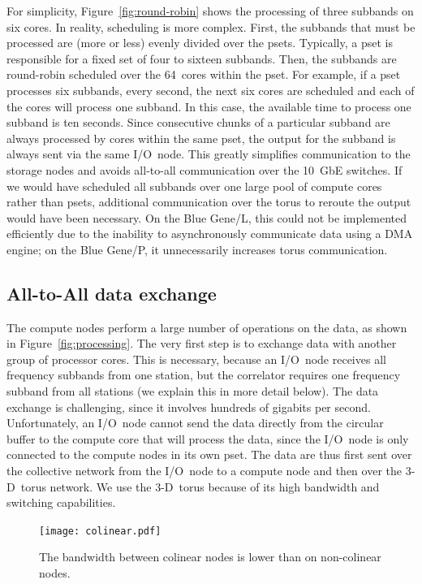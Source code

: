 \documentclass[10pt]{article}
\begin{document}
For simplicity, Figure~\ref{fig:round-robin} shows the processing of
three subbands on six cores.
In reality, scheduling is more complex.
First, the subbands that must be processed are (more or less) evenly divided
over the psets.
Typically, a pset is responsible for a fixed set of four to sixteen subbands.
Then, the subbands are round-robin scheduled over the 64~cores within the
pset.
For example, if a pset processes six subbands, every second, the next six
cores are scheduled and each of the cores will process one subband.
In this case, the available time to process one subband is ten seconds.
Since consecutive chunks of a particular subband are always processed by cores
within the same pset, the output for the subband is always sent via the same
I/O~node.
This greatly simplifies communication to the storage nodes and avoids
all-to-all communication over the 10~GbE switches.
If we would have scheduled all subbands over one large pool of compute cores
rather than psets, additional communication over the torus to reroute the
output would have been necessary.
On the Blue Gene/L, this could not be implemented efficiently due to the
inability to asynchronously communicate data using a DMA engine; on the
Blue Gene/P, it unnecessarily increases torus communication.


\subsection{All-to-All data exchange}

The compute nodes perform a large number of operations on the data, as shown in
Figure~\ref{fig:processing}.
The very first step is to exchange data with another group of processor cores.
This is necessary, because an I/O~node receives all frequency subbands from one
station, but the correlator requires one frequency subband from all
stations (we explain this in more detail below).
The data exchange is challenging, since it involves hundreds of gigabits per
second.
Unfortunately, an I/O~node cannot send the data directly from the circular
buffer to the compute core that will process the data, since the I/O~node is
only connected to the compute nodes in its own pset.
The data are thus first sent over the collective network from the I/O~node to
a compute node and then over the 3-D~torus network.
We use the 3-D~torus because of its high bandwidth and switching capabilities.

\begin{figure}
\begin{center}
\texttt{[image: colinear.pdf]}
\end{center}
\caption{The bandwidth between colinear nodes is lower than on non-colinear nodes.}
\label{fig:colinear}
\end{figure}
\end{document}
